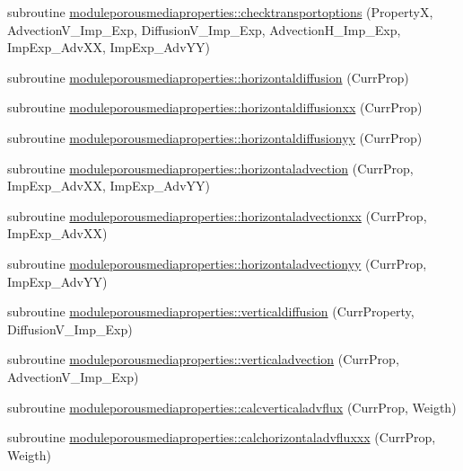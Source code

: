\begin{DoxyCompactItemize}
\item 
subroutine \mbox{\hyperlink{namespacemoduleporousmediaproperties_a1f506b4d3d9d8a845ba272fe4a1b867e}{moduleporousmediaproperties\+::checktransportoptions}} (PropertyX, Advection\+V\+\_\+\+Imp\+\_\+\+Exp, Diffusion\+V\+\_\+\+Imp\+\_\+\+Exp, Advection\+H\+\_\+\+Imp\+\_\+\+Exp, Imp\+Exp\+\_\+\+Adv\+XX, Imp\+Exp\+\_\+\+Adv\+YY)
\item 
subroutine \mbox{\hyperlink{namespacemoduleporousmediaproperties_a46d137d0c183e1c9fcad5f72b1101ffd}{moduleporousmediaproperties\+::horizontaldiffusion}} (Curr\+Prop)
\item 
subroutine \mbox{\hyperlink{namespacemoduleporousmediaproperties_a3a2fc7f94588508e3f73f83cdb76a6af}{moduleporousmediaproperties\+::horizontaldiffusionxx}} (Curr\+Prop)
\item 
subroutine \mbox{\hyperlink{namespacemoduleporousmediaproperties_a9bd1af2c6e3a19167f538d7c25d74e6b}{moduleporousmediaproperties\+::horizontaldiffusionyy}} (Curr\+Prop)
\item 
subroutine \mbox{\hyperlink{namespacemoduleporousmediaproperties_a7327a640c1b4db8bbf9db21d1a859a88}{moduleporousmediaproperties\+::horizontaladvection}} (Curr\+Prop, Imp\+Exp\+\_\+\+Adv\+XX, Imp\+Exp\+\_\+\+Adv\+YY)
\item 
subroutine \mbox{\hyperlink{namespacemoduleporousmediaproperties_a8e5f48df8b88839f3c864bb3668c251a}{moduleporousmediaproperties\+::horizontaladvectionxx}} (Curr\+Prop, Imp\+Exp\+\_\+\+Adv\+XX)
\item 
subroutine \mbox{\hyperlink{namespacemoduleporousmediaproperties_a4de4628b721cc4ace9457a05e6b46f11}{moduleporousmediaproperties\+::horizontaladvectionyy}} (Curr\+Prop, Imp\+Exp\+\_\+\+Adv\+YY)
\item 
subroutine \mbox{\hyperlink{namespacemoduleporousmediaproperties_a872ba647c81cc1f00e69bd02b7418258}{moduleporousmediaproperties\+::verticaldiffusion}} (Curr\+Property, Diffusion\+V\+\_\+\+Imp\+\_\+\+Exp)
\item 
subroutine \mbox{\hyperlink{namespacemoduleporousmediaproperties_a0872f72bfebe157c1a7a7030f27bf43c}{moduleporousmediaproperties\+::verticaladvection}} (Curr\+Prop, Advection\+V\+\_\+\+Imp\+\_\+\+Exp)
\item 
subroutine \mbox{\hyperlink{namespacemoduleporousmediaproperties_a073f545385ee87d0157436c464e871fa}{moduleporousmediaproperties\+::calcverticaladvflux}} (Curr\+Prop, Weigth)
\item 
subroutine \mbox{\hyperlink{namespacemoduleporousmediaproperties_a5723fa1fcf71ee69d8401d06efd65372}{moduleporousmediaproperties\+::calchorizontaladvfluxxx}} (Curr\+Prop, Weigth)

\end{DoxyCompactItemize}
